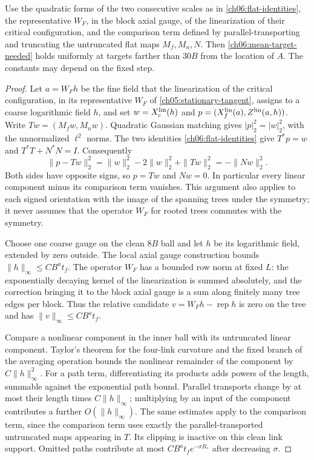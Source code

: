 \begin{proposition}
\label{ch06:mean-cancellation}
Use the quadratic forms of the two consecutive scales as in
\eqref{ch06:flat-identities}, the representative $W_F$, in the block axial gauge, of the linearization of their critical configuration, and the comparison term
defined by parallel-transporting and truncating the untruncated flat maps $M_f,M_n,N$. Then
\eqref{ch06:mean-target-needed} holds uniformly at targets farther than
$30B$ from the location of $A$. The constants may depend on the fixed step.
\end{proposition}
\begin{proof}
Let $a=W_F h$ be the fine field that the linearization of the critical configuration, in its representative $W_F$ of \eqref{ch05:stationary-tangent}, assigns to a coarse
logarithmic field $h$, and set $w=X_c^{\rm lin}(h)$ and
$p=(X_f^{\rm lin}(a),Z^{\rm lin}(a,h))$. Write
$T w=(M_fw,M_nw)$. Quadratic Gaussian matching gives
$|p|_2^2=|w|_2^2$, with the unnormalized $\ell^2$ norms. The two identities
\eqref{ch06:flat-identities} give $T^*p=w$ and $T^*T+N^*N=I$.
Consequently
\[
 \|p-Tw\|_2^2
 =\|w\|_2^2-2\|w\|_2^2+\|Tw\|_2^2=-\|Nw\|_2^2.
\]
Both sides have opposite signs, so $p=Tw$ and $Nw=0$.
In particular every linear component minus its comparison term vanishes. This argument
also applies to each signed orientation with the image of the spanning trees under the symmetry;
it never assumes that the operator $W_F$ for rooted trees commutes with the symmetry.

Choose one coarse gauge on the clean $8B$ ball and let $h$ be its
logarithmic field, extended by zero outside. The local axial gauge
construction bounds $\|h\|_\infty\le C B^a t_f$.
The operator $W_F$ has a bounded row norm at fixed $L$:
the exponentially decaying kernel of the linearization is summed absolutely,
and the correction bringing it to the block axial gauge is a sum along finitely many tree
edges per block. Thus the relative candidate
$v=W_Fh-\operatorname{rep}h$ is zero on the tree and has
$\|v\|_\infty\le C B^a t_f$.

Compare a nonlinear component in the inner ball with its untruncated linear component.
Taylor's theorem for the four-link curvature and the fixed
branch of the averaging operation bounds the nonlinear remainder of the component by $C\|h\|_\infty^2$.
For a path term, differentiating its products adds powers of the
length, summable against the exponential path bound.
Parallel transports change by at most their length times
$C\|h\|_\infty$; multiplying by an input of the component contributes a further
$O(\|h\|_\infty)$. The same estimates apply to the comparison term, since
the comparison term uses exactly the parallel-transported untruncated maps appearing in $T$.
Its clipping is inactive on this clean link support.
Omitted paths contribute at most
$C B^a t_f e^{-\sigma R_*}$ after decreasing $\sigma$.


\end{proof}

